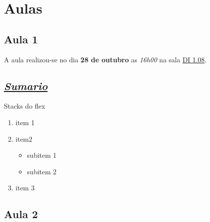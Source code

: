 \section{Aulas}

\subsection{Aula 1}

A aula realizou-se no dia \textbf{28 de outubro}
as \textit{16h00} na sala \underline{DI 1.08}.

\subsection{\textit{\underline{Sumario}}}
Stacks do flex

\begin{enumerate}
    \item item 1
    \item item2
        \begin{itemize}
            \item subitem 1
            \item subitem 2
        \end{itemize}
    \item item 3
\end{enumerate}

\subsection{Aula 2}